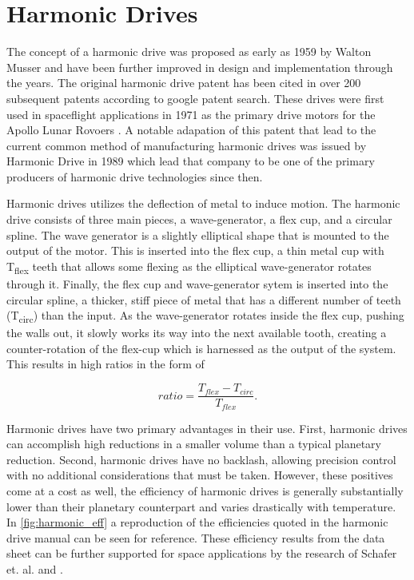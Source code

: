 \section{Harmonic Drives} \label{intro:harmonic}

The concept of a harmonic drive was proposed as early as 1959 by Walton Musser \cite{ref:harmonic_original} and have been further improved in design and implementation through the years. The original harmonic drive patent has been cited in over 200 subsequent patents according to google patent search. These drives were first used in spaceflight applications in 1971 as the primary drive motors for the Apollo Lunar Rovoers \cite{ref:harmonic_apollo}. A notable adapation of this patent that lead to the current common method of manufacturing harmonic drives was issued by Harmonic Drive in 1989 \cite{ref:harmonic_drive_co} which lead that company to be one of the primary producers of harmonic drive technologies since then. 

Harmonic drives utilizes the deflection of metal to induce motion. The harmonic drive consists of three main pieces, a wave-generator, a flex cup, and a circular spline. The wave generator is a slightly elliptical shape that is mounted to the output of the motor. This is inserted into the flex cup, a thin metal cup with T\textsubscript{flex} teeth that allows some flexing as the elliptical wave-generator rotates through it. Finally, the flex cup and wave-generator sytem is inserted into the circular spline, a thicker, stiff piece of metal that has a different number of teeth (T\textsubscript{circ}) than the input. As the wave-generator rotates inside the flex cup, pushing the walls out, it slowly works its way into the next available tooth, creating a counter-rotation of the flex-cup which is harnessed as the output of the system. This results in high ratios in the form of 

\begin{equation} \label{eq:0}
ratio = \frac{T_{flex} - T_{circ}} {T_{flex}}.
\end{equation}

Harmonic drives have two primary advantages in their use. First, harmonic drives can accomplish high reductions in a smaller volume than a typical planetary reduction. Second, harmonic drives have no backlash, allowing precision control with no additional considerations that must be taken. However, these positives come at a cost as well, the efficiency of harmonic drives is generally substantially lower than their planetary counterpart and varies drastically with temperature. In \ref{fig:harmonic_eff} a reproduction of the efficiencies quoted in the harmonic drive manual can be seen for reference. These efficiency results from the data sheet can be further supported for space applications by the research of Schafer et. al. \cite{ref:harmonic_space_lube} and \cite{ref:harmonic_performance}.

